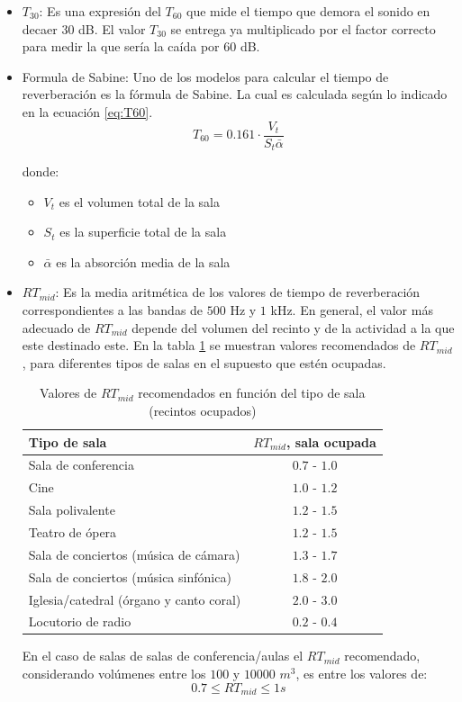 \begin{itemize}
    \item $T_{30}$: Es una expresión del $T_{60}$ que mide el tiempo que demora el sonido en decaer $30$ dB. El valor $T_{30}$ se entrega ya multiplicado por el factor correcto para medir la que sería la caída por $60$ dB.
    \item Formula de Sabine: Uno de los modelos para calcular el tiempo de reverberación es la fórmula de Sabine. La cual es calculada según lo indicado en la ecuación \ref{eq:T60}. \cite{sabine1922collected}
    \begin{equation} \label{eq:T60} 
     T_{60}=0.161 \cdot \frac{V_{t}}{S_{t} \bar{\alpha}}
    \end{equation}

    donde:
    \begin{itemize}
        \item $V_t$ es el volumen total de la sala
        \item $S_t$ es la superficie total de la sala
        \item $\bar{\alpha}$ es la absorción media de la sala
\end{itemize}
    \item $RT_{mid}$: Es la media aritmética de los valores de tiempo de reverberación correspondientes a las bandas de $500$ Hz y $1$ kHz. En general, el valor más adecuado de $RT_{mid}$ depende del volumen del recinto y de la actividad a la que este destinado este. En la tabla \ref{tab:rtmid recomendado por tipo de sala} se muestran valores recomendados de $RT_{mid}$, para diferentes tipos de salas en el supuesto que estén ocupadas. \cite{carrion1990diseno}
    \begin{table}[H]
        \centering
        \begin{tabular}{|l|c|}
        \hline
             \textbf{Tipo de sala} &  $RT_{mid}$\textbf{, sala ocupada}\\ \hline
             Sala de conferencia& 
             $0.7$ - $1.0$\\
             Cine             & $1.0$ - $1.2$\\
             Sala polivalente & $1.2$ - $1.5$\\
             Teatro de ópera & $1.2$ - $1.5$\\
             Sala de conciertos (música de cámara) & $1.3$ - $1.7$\\
             Sala de conciertos (música sinfónica) & $1.8$ - $2.0$\\
             Iglesia/catedral (órgano y canto coral) & $2.0$ - $3.0$\\
             Locutorio de radio & $0.2$ - $0.4$\\ \hline
        \end{tabular}
        \caption{Valores de $RT_{mid}$ recomendados en función del tipo de sala (recintos ocupados)}
        \label{tab:rtmid recomendado por tipo de sala}
    \end{table}
    En el caso de salas de salas de conferencia/aulas el $RT_{mid}$ recomendado, considerando volúmenes entre los $100$ y $10000$ $m^3$, es entre los valores de:
    \[0.7 \leq RT_{mid} \leq 1 s \]


\end{itemize}
